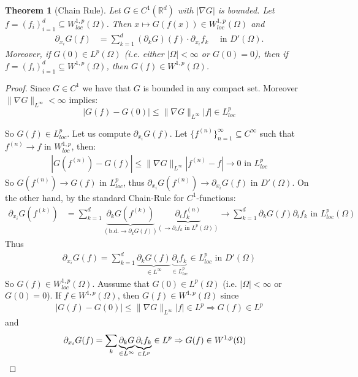 \documentclass{report}
\theoremstyle{tommy}
\newtheorem{thm}[defn]{Theorem}
\begin{document}
  \begin{thm}[Chain Rule]
    Let \(G \in C^1(\mathbb{R}^d)\) with \(|\nabla G|\) is bounded. Let \(f = (f_i)_{i=1}^d \subseteq W_{loc}^{1,p}(\Omega)\). Then \(x \mapsto G(f(x)) \in W_{loc}^{1,p}(\Omega)\) and
    \begin{align*}
      \partial_{x_i} G(f)
      &= \sum_{k=1}^d (\partial_k G)(f) \cdot \partial_{x_i} f_k \quad \text{ in } D'(\Omega).
    \end{align*}
    Moreover, if \(G(0) \in L^p(\Omega)\) (i.e. either \(|\Omega| < \infty\) or \(G(0) = 0\)), then if \(f = (f_i)_{i=1}^d \subseteq W^{1,p}(\Omega)\), then \(G(f) \in W^{1,p}(\Omega)\).
  \end{thm}

  \begin{proof}
    Since \(G \in C^1\) we have that \(G\) is bounded in any compact set. Moreover \(\|\nabla G\|_{L^\infty} < \infty\) implies:
    \[|G(f) - G(0)| \le \|\nabla G\|_{L^\infty} |f| \in L^p_{loc}\]
  
    So \(G(f) \in L_{loc}^p\). Let us compute \(\partial_{x_i} G(f)\). Let \(\{f^{(n)}\}_{n=1}^\infty \subseteq C^\infty\) such that \(f^{(n)} \to f\) in \(W_{loc}^{1,p}\), then: 
    \begin{align*}
      |G(f^{(n)}) - G(f)|
      \le \|\nabla G\|_{L^\infty} |f^{(n)} - f| \to 0 \text{ in  \(L_{loc}^p\)}
    \end{align*}
    So \(G(f^{(n)}) \to G(f)\) in \(L_{loc}^p\), thus \(\partial_{x_i} G(f^{(n)}) \to \partial_{x_i} G(f)\) in \(D'(\Omega)\). On the other hand, by the standard Chain-Rule for \(C^1\)-functions:
    \begin{align*}
      \partial_{x_i} G(f^{(k)})
      &= \sum_{k=1}^d \underbrace{\partial_k G(f^{(k)})}_{(\text{b.d.} \to \partial_k G(f))} \underbrace{\partial_i f_k^{(n)}}_{(\to \partial_i f_k \text{ in } L^p(\Omega))} \to \sum_{k=1}^d \partial_k G(f) \partial_i f_k \text{ in }L_{loc}^p(\Omega)
    \end{align*}
    Thus
    \begin{align*}
      \partial_{x_i} G(f) = \sum_{k=1}^d \underbrace{\partial_k G(f)}_{\in L^\infty} \underbrace{\partial_i f_k}_{\in L_{loc}^p} \in L_{loc}^p \text{ in } D'(\Omega)
    \end{align*}
    So \(G(f) \in W_{loc}^{1,p}(\Omega)\). Aussume that \(G(0) \in L^p(\Omega)\) (i.e. \(|\Omega| < \infty\) or \(G(0) = 0\)). If \(f \in W^{1,p}(\Omega)\), then \(G(f) \in W^{1,p}(\Omega)\) since
    \begin{align*}
      |G(f) - G(0) | \le \|\nabla G\|_{L^\infty} |f| \in L^p \Rightarrow G(f) \in L^p
    \end{align*}
    and 
    \begin{align*}
      \partial_{x_i} G(f) &= \sum_k \underbrace{\partial_k G}_{\in L^\infty} \underbrace{\partial_i f_k}_{\in L^p} \in L^p \Rightarrow G(f) \in W^{1,p}(\Omega) \qedhere
    \end{align*}
  \end{proof}
  
\end{document}
